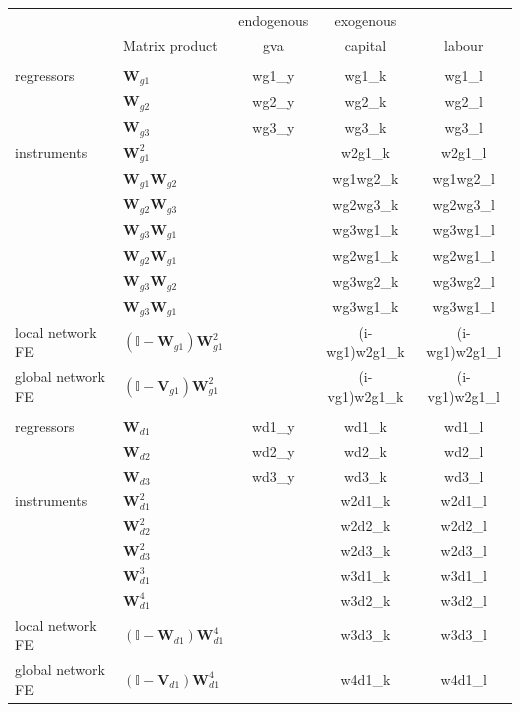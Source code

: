 \begin{tabular}{llccc}
	\toprule\toprule
	~ & ~ & endogenous & exogenous & ~ \\[0.8em]
	~ & Matrix product & gva & capital & labour \\[0.9em]
	\midrule
	\addlinespace[0.8em]
	\multicolumn{5}{l}{\itx{Groups}} \\[0.4em]
	\hline
	regressors & $\mathbf W_{g1}$ & wg1\_y & wg1\_k & wg1\_l \\[0.9em]
	~ & $\mathbf W_{g2}$ & wg2\_y & wg2\_k & wg2\_l \\[0.9em]
	~ & $\mathbf W_{g3}$ & wg3\_y & wg3\_k & wg3\_l \\[0.9em]
	instruments & $\mathbf W^2_{g1}$ & ~ & w2g1\_k & w2g1\_l \\[0.9em]
	~ & $\mathbf W_{g1}\mathbf W_{g2}$ & ~ & wg1wg2\_k & wg1wg2\_l \\[0.9em]
	~ & $\mathbf W_{g2}\mathbf W_{g3}$ & ~ & wg2wg3\_k & wg2wg3\_l \\[0.9em]
	~ & $\mathbf W_{g3}\mathbf W_{g1}$ & ~ & wg3wg1\_k & wg3wg1\_l \\[0.9em]
	~ & $\mathbf W_{g2}\mathbf W_{g1}$ & ~ & wg2wg1\_k & wg2wg1\_l \\[0.9em]
	~ & $\mathbf W_{g3}\mathbf W_{g2}$ & ~ & wg3wg2\_k & wg3wg2\_l \\[0.9em]
	~ & $\mathbf W_{g3}\mathbf W_{g1}$ & ~ & wg3wg1\_k & wg3wg1\_l \\[0.9em]
	local network FE & $(\mathbb I-\mathbf W_{g1})\mathbf W^2_{g1}$ & ~ & (i-wg1)w2g1\_k & (i-wg1)w2g1\_l \\[0.9em]
	global network FE & $(\mathbb I-\mathbf V_{g1})\mathbf W^2_{g1}$ & ~ & (i-vg1)w2g1\_k & (i-vg1)w2g1\_l \\[0.9em]
	\addlinespace[0.8em]
	\multicolumn{5}{l}{\itx{Network}} \\[0.4em]
	\hline
	regressors & $\mathbf W_{d1}$ & wd1\_y & wd1\_k & wd1\_l \\[0.9em]
	~ & $\mathbf W_{d2}$ & wd2\_y & wd2\_k & wd2\_l \\[0.9em]
	~ & $\mathbf W_{d3}$ & wd3\_y & wd3\_k & wd3\_l \\[0.9em]
	instruments & $\mathbf W^2_{d1}$ & ~ & w2d1\_k & w2d1\_l \\[0.9em]
	~ & $\mathbf W^2_{d2}$ & ~ & w2d2\_k & w2d2\_l \\[0.9em]
	~ & $\mathbf W^2_{d3}$ & ~ & w2d3\_k & w2d3\_l \\[0.9em]
	~ & $\mathbf W^3_{d1}$ & ~ & w3d1\_k & w3d1\_l \\[0.9em]
	~ & $\mathbf W^4_{d1}$ & ~ & w3d2\_k & w3d2\_l \\[0.9em]
	local network FE & $(\mathbb I-\mathbf W_{d1})\mathbf W^4_{d1}$ & ~ & w3d3\_k & w3d3\_l \\[0.9em]
	global network FE & $(\mathbb I-\mathbf V_{d1})\mathbf W^4_{d1}$ & ~ & w4d1\_k & w4d1\_l \\[0.9em]
	\bottomrule
\end{tabular}